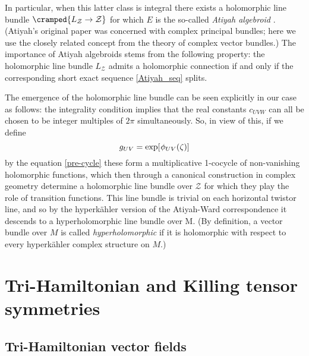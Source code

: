 \documentclass[11pt]{amsart}
\theoremstyle{remark}
\theoremstyle{remark}
\theoremstyle{definition}
\theoremstyle{definition}
\theoremstyle{definition}
\newcommand{\0}{{\scriptstyle 0'}} %
\newcommand{\1}{{\scriptstyle 1'}}
\newcommand{\pt}{\hspace{1pt}} %
\newcommand{\hp}{\hspace{0.5pt}} %
\begin{document}
In particular, when this latter class is integral there exists a holomorphic line bundle $\cramped{L_{\mathcal{Z}} \rightarrow \mathcal{Z}}$ for which $E$ is the so-called \textit{Atiyah algebroid} \cite{MR0086359}. (Atiyah's original paper was concerned with complex principal bundles; here we use the closely related concept from the theory of complex vector bundles.) The importance of Atiyah algebroids stems from the following property: the holomorphic line bundle $L_{\mathcal{Z}}$ admits a holomorphic connection if and only if the corresponding short exact sequence \eqref{Atiyah_seq} splits. 

The emergence of the holomorphic line bundle can be seen explicitly in our case as follows: the integrality condition implies that the real constants $c_{UVW}$ can all be chosen to be integer multiples of $2\pi$ simultaneously. So, in view of this, if we define
\begin{equation} \label{hh-trans-fcts}
g_{UV} = \exp [\hp \phi_{UV}(\zeta)]
\end{equation}
by the equation \eqref{pre-cycle} these form a multiplicative 1-cocycle of non-vanishing holomorphic functions, which then through a canonical construction in complex geometry determine a holomorphic line bundle over $\mathcal{Z}$ for which they play the role of transition functions. This line bundle is trivial on each horizontal twistor line, and so by the hyperk\"ahler version of the Atiyah\pt-Ward correspondence it descends to a hyperholomorphic line bundle over M. (By definition, a vector bundle over $M$ is called \textit{hyperholomorphic} if it is holomorphic with respect to every hyperk\"ahler complex structure on $M$.) 






\section{Tri-Hamiltonian and Killing tensor symmetries} \label{sec:Tri-Ham}


\subsection{Tri-Hamiltonian vector fields} \label{ssec:tri-Ham} \hfill \medskip
\end{document}
